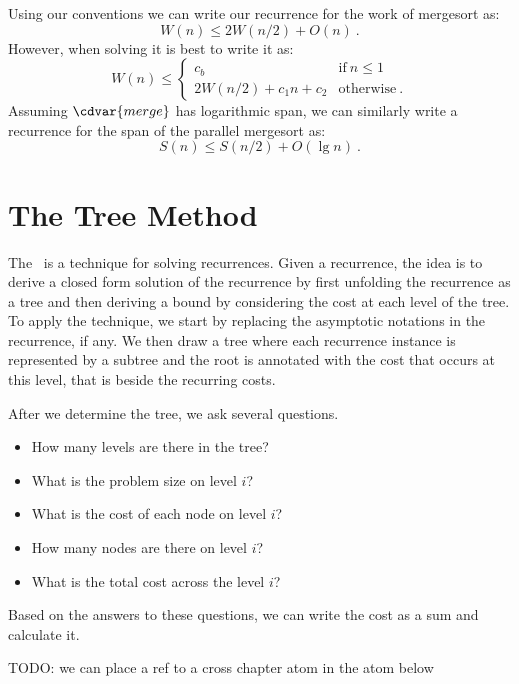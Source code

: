 \begin{example}
Using our conventions we can write our recurrence for the work of
mergesort as:
\[W(n) \leq 2W(n/2) + O(n)~.\]
However, when solving it is best to write it as:
\[
W(n) \leq \left\{
\begin{array}{lll}
c_b & \mbox{if}~n \leq 1
\\
2W(n/2) + c_1 n + c_2 & \mbox{otherwise} ~.
\end{array}
\right. 
\]
Assuming $\cdvar{merge}$ has logarithmic span, we can similarly write
a recurrence for the span of the parallel mergesort as:
\[S(n) \leq S(n/2) + O(\lg n)~.\]
\end{example}

\section{The Tree Method}
\label{sec:analysis::recurrences::tree-method}

\begin{definition}
The~ is a technique for solving recurrences.
%
Given a recurrence, the idea is to derive a closed form solution of
the recurrence by first unfolding the recurrence as a tree and then
deriving a bound by considering the cost at each level of the tree.
%
To apply the technique, we start by replacing the asymptotic notations
in the recurrence, if any.
%
We then draw a tree where each recurrence instance is represented by a
subtree and the root is annotated with the cost that occurs at this
level, that is beside the recurring costs. 

After we determine the tree, we ask several questions.
%
\begin{itemize}
\item How many levels are there in the tree?
\item What is the problem size on level $i$?
\item What is the cost of each node on level $i$?
\item How many nodes are there on level $i$?
\item What is the total cost across the level $i$?
\end{itemize}

Based on the answers to these questions, we can write the cost as a
sum and calculate it.
\end{definition}

\begin{teachnote}
TODO: we can place a ref to a cross chapter atom in the atom below
\end{teachnote}

